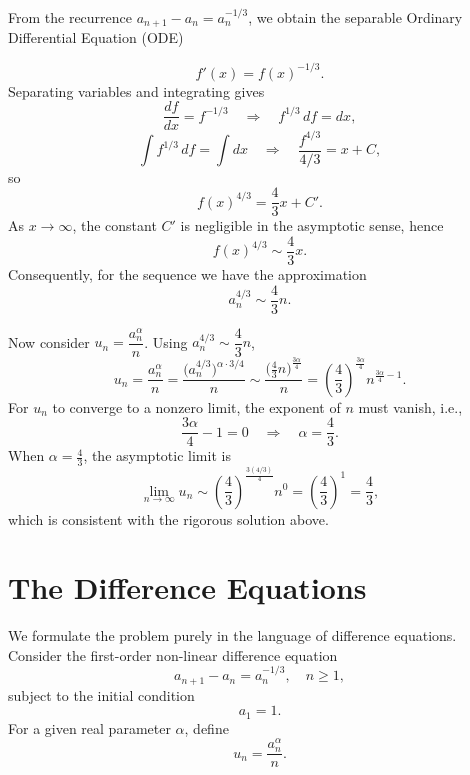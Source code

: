 \documentclass{article}
\begin{document}

From the recurrence $a_{n+1} - a_n = a_n^{-1/3}$, we obtain the separable Ordinary Differential Equation (ODE)

$$ f'(x) = f(x)^{-1/3}. $$
Separating variables and integrating gives
$$ \frac{df}{dx} = f^{-1/3} \quad \Rightarrow \quad f^{1/3}\, df = dx, $$
$$ \int f^{1/3}\, df = \int dx \quad \Rightarrow \quad \frac{f^{4/3}}{4/3} = x + C, $$
so
$$ f(x)^{4/3} = \frac{4}{3}x + C'. $$
As $x \to \infty$, the constant $C'$ is negligible in the asymptotic sense, hence
$$ f(x)^{4/3} \sim \frac{4}{3}x. $$
Consequently, for the sequence we have the approximation
$$ a_n^{4/3} \sim \frac{4}{3}n. $$

Now consider $u_n = \dfrac{a_n^{\alpha}}{n}$. Using $a_n^{4/3} \sim \dfrac{4}{3}n$,
$$ u_n = \frac{a_n^{\alpha}}{n} = \frac{\big(a_n^{4/3}\big)^{\alpha\cdot 3/4}}{n}
\sim \frac{\big(\tfrac{4}{3}n\big)^{\frac{3\alpha}{4}}}{n}
= \left(\frac{4}{3}\right)^{\frac{3\alpha}{4}} n^{\frac{3\alpha}{4}-1}. $$
For $u_n$ to converge to a nonzero limit, the exponent of $n$ must vanish, i.e.,
$$ \frac{3\alpha}{4} - 1 = 0 \quad \Longrightarrow \quad \alpha = \frac{4}{3}. $$
When $\alpha = \tfrac{4}{3}$, the asymptotic limit is
$$ \lim_{n\to\infty} u_n \sim \left(\frac{4}{3}\right)^{\frac{3(4/3)}{4}} n^{0} = \left(\frac{4}{3}\right)^{1} = \frac{4}{3}, $$
which is consistent with the rigorous solution above.

\section{The Difference Equations}
We formulate the problem purely in the language of difference equations. 
Consider the first-order non-linear difference equation
$$ a_{n+1} - a_n = a_n^{-1/3}, \quad n \ge 1, $$
subject to the initial condition
$$ a_1 = 1. $$
For a given real parameter $\alpha$, define
$$ u_n = \frac{a_n^\alpha}{n}. $$
\end{document}
